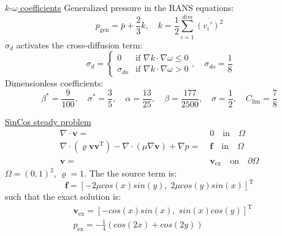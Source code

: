 \documentclass{beamer}
\begin{document}
\begin{frame}[label=koSupp]{\hyperlink{ko}{$k\text{-}\omega$ coefficients}}
Generalized pressure in the RANS equations:
\begin{equation*}
	p_\text{gen} = \bar{p} + \frac{2}{3}k, \quad k = \frac{1}{2} 
	\sum_{i=1}^{dim} \overline{(v_i')^2}
\end{equation*}
$\sigma_d$ activates the cross-diffusion term:
\begin{equation*}
\sigma_d =
\begin{cases} 0 &\text{if $\nabla k \cdot \nabla \omega \leq 0$}\\
\sigma_{do} &\text{if $\nabla k \cdot \nabla \omega > 0$}
\end{cases},
\quad \sigma_{do} = \frac{1}{8}
\end{equation*}
Dimensionless coefficients:
\begin{equation*}
\beta^* = \frac{9}{100}, \quad \sigma^* = \frac{3}{5}, \quad \alpha = 
\frac{13}{25}, \quad \beta = \frac{177}{2500}, \quad \sigma = \frac{1}{2}, 
\quad C_\text{lim} = \frac{7}{8}
\end{equation*}
\end{frame}
\begin{frame}[label=spaceconvSupp]{\hyperlink{spaceconv}{SinCos steady problem}}
\begin{align*}
\nabla \cdot \mathbf{v} =& \; 0 \quad \text{in} \quad \Omega\\
\nabla \cdot (\varrho \mathbf{v} \mathbf{v^\mathrm{T}}) - \nabla \cdot (\mu 
\nabla \mathbf{v}) + 
\nabla p =& \; \mathbf{f} \quad \text{in} \quad \Omega\\
\mathbf{v} =& \; \mathbf{v}_\text{ex} \quad \text{on} \quad \partial \Omega
\end{align*}
$\Omega = (0,1)^2$, $\varrho = 1$. The the source term is:
\begin{equation*}
\mathbf{f} = [-2 \mu cos(x) sin(y), \; 2 \mu cos(y) sin(x)]^\mathrm{T}
\end{equation*}
such that the exact solution is:
\begin{align*}
&\mathbf{v}_\text{ex} = [-cos(x) sin(x), \; sin(x) cos(y)]^\mathrm{T}\\
&p_\text{ex} = -\frac{1}{4} (cos(2x)+cos(2y))
\end{align*}
\end{frame}
\end{document}
